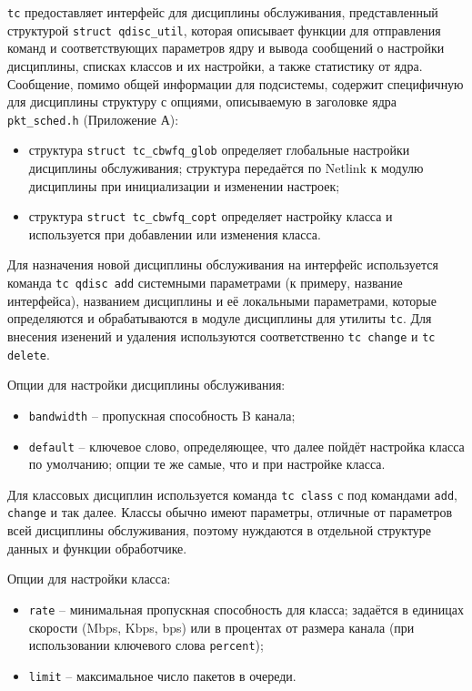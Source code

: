 	\texttt{tc} предоставляет интерфейс для дисциплины обслуживания,
	представленный структурой \lstinline{struct qdisc_util}, которая
	описывает функции для отправления команд и соответствующих параметров ядру
	и вывода сообщений о настройки дисциплины, списках классов и их настройки, а
	также статистику от ядра. Сообщение, помимо общей информации для подсистемы,
	содержит специфичную для дисциплины структуру с опциями, описываемую
	в заголовке ядра \texttt{pkt\_sched.h} (Приложение А):
	\begin{itemize}
		\item структура \lstinline{struct tc_cbwfq_glob} определяет глобальные настройки
			  дисциплины обслуживания; структура передаётся по Netlink к модулю дисциплины
			  при инициализации и изменении настроек;
		\item структура \lstinline{struct tc_cbwfq_copt} определяет настройку
			  класса и используется при добавлении или изменения класса.
	\end{itemize}

	Для назначения новой дисциплины обслуживания на интерфейс используется
	команда \lstinline{tc qdisc add} системными параметрами (к примеру, название
	интерфейса), названием дисциплины и её локальными параметрами, которые
	определяются и обрабатываются в модуле дисциплины для утилиты \texttt{tc}. 
	Для внесения изенений и удаления используются соответственно \lstinline{tc change}
	и \lstinline{tc delete}.

	Опции для настройки дисциплины обслуживания:
	\begin{itemize}
		\item \lstinline{bandwidth} -- пропускная способность B канала;
		\item \lstinline{default} -- ключевое слово, определяющее, что далее пойдёт
									 настройка класса по умолчанию; опции те же самые, что
									 и при настройке класса.  
	\end{itemize}

	Для классовых дисциплин используется команда \lstinline{tc class} с под командами
	\lstinline{add}, \lstinline{change} и так далее. Классы обычно имеют параметры,
	отличные от параметров всей дисциплины обслуживания, поэтому нуждаются в отдельной
	структуре данных и функции обработчике.

	Опции для настройки класса:
	\begin{itemize}
		\item \lstinline{rate} -- минимальная пропускная способность для класса;
											  задаётся в единицах скорости (Mbps, Kbps, bps) или в процентах
											  от размера канала (при использовании ключевого слова \lstinline{percent});
		\item \lstinline{limit} -- максимальное число пакетов в очереди.
	\end{itemize}

